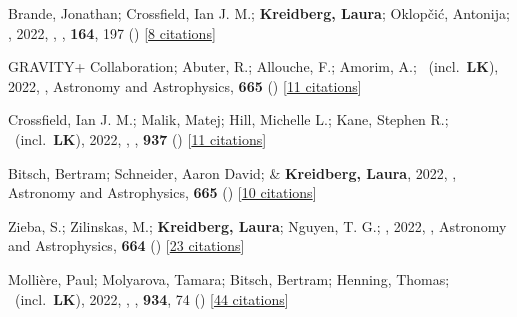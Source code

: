 \item[{\color{numcolor}\scriptsize71}] Brande, Jonathan; Crossfield, Ian J. M.; \textbf{Kreidberg, Laura}; Oklop{\v{c}}i{\'c}, Antonija; \etal, 2022, , \aj, \textbf{164}, 197 () [\href{https://ui.adsabs.harvard.edu/abs/2022AJ....164..197B}{8 citations}]

\item[{\color{numcolor}\scriptsize70}] GRAVITY+ Collaboration; Abuter, R.; Allouche, F.; Amorim, A.; \etal\ (incl.\ \textbf{LK}), 2022, , Astronomy and Astrophysics, \textbf{665} () [\href{https://ui.adsabs.harvard.edu/abs/2022A&A...665A..75G}{11 citations}]

\item[{\color{numcolor}\scriptsize69}] Crossfield, Ian J. M.; Malik, Matej; Hill, Michelle L.; Kane, Stephen R.; \etal\ (incl.\ \textbf{LK}), 2022, , \apj, \textbf{937} () [\href{https://ui.adsabs.harvard.edu/abs/2022ApJ...937L..17C}{11 citations}]

\item[{\color{numcolor}\scriptsize68}] Bitsch, Bertram; Schneider, Aaron David; \& \textbf{Kreidberg, Laura}, 2022, , Astronomy and Astrophysics, \textbf{665} () [\href{https://ui.adsabs.harvard.edu/abs/2022A&A...665A.138B}{10 citations}]

\item[{\color{numcolor}\scriptsize67}] Zieba, S.; Zilinskas, M.; \textbf{Kreidberg, Laura}; Nguyen, T. G.; \etal, 2022, , Astronomy and Astrophysics, \textbf{664} () [\href{https://ui.adsabs.harvard.edu/abs/2022A&A...664A..79Z}{23 citations}]

\item[{\color{numcolor}\scriptsize66}] Molli{\`e}re, Paul; Molyarova, Tamara; Bitsch, Bertram; Henning, Thomas; \etal\ (incl.\ \textbf{LK}), 2022, , \apj, \textbf{934}, 74 () [\href{https://ui.adsabs.harvard.edu/abs/2022ApJ...934...74M}{44 citations}]

